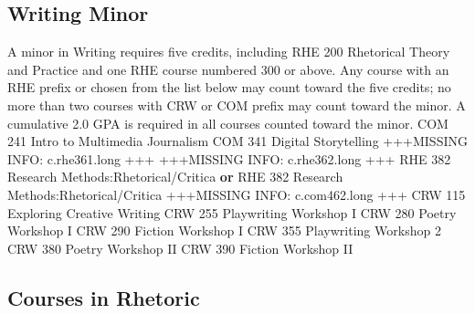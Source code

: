 \documentclass[
  letterpaper,
]{scrbook}
\begin{document}
\hypertarget{writing-minor}{%
\subsection{Writing Minor}\label{writing-minor}}

A minor in Writing requires five credits, including RHE 200 Rhetorical
Theory and Practice and one RHE course numbered 300 or above. Any course
with an RHE prefix or chosen from the list below may count toward the
five credits; no more than two courses with CRW or COM prefix may count
toward the minor. A cumulative 2.0 GPA is required in all courses
counted toward the minor. COM 241 Intro to Multimedia Journalism COM 341
Digital Storytelling +++MISSING INFO: c.rhe361.long +++ +++MISSING INFO:
c.rhe362.long +++ RHE 382 Research Methods:Rhetorical/Critica
\textbf{or} RHE 382 Research Methods:Rhetorical/Critica +++MISSING INFO:
c.com462.long +++ CRW 115 Exploring Creative Writing CRW 255 Playwriting
Workshop I CRW 280 Poetry Workshop I CRW 290 Fiction Workshop I CRW 355
Playwriting Workshop 2 CRW 380 Poetry Workshop II CRW 390 Fiction
Workshop II

\hypertarget{courses-in-rhetoric}{%
\subsection{Courses in Rhetoric}\label{courses-in-rhetoric}}
\end{document}
